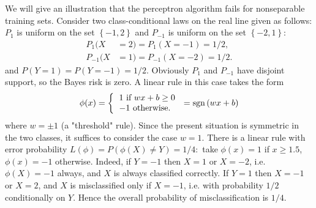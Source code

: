 \documentclass[11pt,twoside]{article}%
\theoremstyle{change}
\begin{document}
We will give an illustration that the perceptron algorithm fails for
nonseparable training sets. Consider two class-conditional laws on the real
line given as follows: $P_{1}$ is uniform on the set $\left\{  -1,2\right\}  $
and $P_{-1}$ is uniform on the set $\left\{  -2,1\right\}  $:
\begin{align*}
P_{1}(X  & =2)=P_{1}(X=-1)=1/2,\\
P_{-1}(X  & =1)=P_{-1}(X=-2)=1/2.
\end{align*}
and $P\left(  Y=1\right)  =P\left(  Y=-1\right)  =1/2$. Obviously $P_{1}$ and
$P_{-1}$ have disjoint support, so the Bayes risk is zero. A linear rule in
this case takes the form
\[
\phi(x)=\left\{
\begin{tabular}
[c]{l}%
$1$ if $wx+b\geq0$\\
$-1$ otherwise$.$%
\end{tabular}
\right.  =\mathrm{sgn}\left(  wx+b\right)
\]
where $w=\pm1$ (a "threshold" rule). Since the present situation is symmetric
in the two classes, it suffices to consider the case $w=1$. There is a linear
rule with error probability $L\left(  \phi\right)  =P\left(  \phi(X)\neq
Y\right)  =1/4:$ take $\phi(x)=1$ if $x\geq1.5$, $\phi(x)=-1$ otherwise.
Indeed, if $Y=-1$ then $X=1$ or $X=-2$, i.e. $\phi(X)=-1$ always, and $X$ is
always classified correctly. If $Y=1$ then $X=-1$ or $X=2$, and $X$ is
misclassified only if $X=-1$, i.e. with probability $1/2$ conditionally on
$Y$. Hence the overall probability of misclassification is $1/4.$
\end{document}
